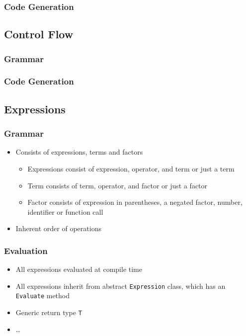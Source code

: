 \subsubsection{Code Generation}

\subsection{Control Flow}
\label{sec:control_flow}
\subsubsection{Grammar}
\subsubsection{Code Generation}

\subsection{Expressions}
\subsubsection{Grammar}
\begin{itemize}
    \item Consists of expressions, terms and factors
    \begin{itemize}
        \item Expressions consist of expression, operator, and term or just a term
        \item Term consists of term, operator, and factor or just a factor
        \item Factor consists of expression in parentheses, a negated factor, number, identifier or function call
    \end{itemize}
    \item Inherent order of operations
\end{itemize}
\subsubsection{Evaluation}
\begin{itemize}
    \item All expressions evaluated at compile time
    \item All expressions inherit from abstract \texttt{Expression} class, which has an \texttt{Evaluate} method
    \item Generic return type \texttt{T}
    \item \dots
\end{itemize}

